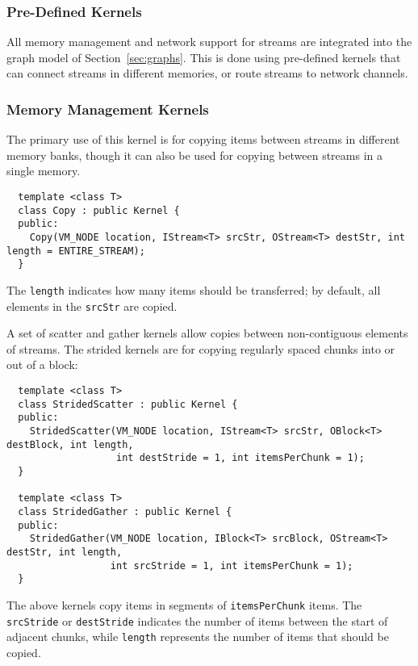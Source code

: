 \subsubsection{Pre-Defined Kernels}
\label{sec:kernelsvm}

\label{sec:predef}

All memory management and network support for streams are integrated
into the graph model of Section~\ref{sec:graphs}.  This is done
using pre-defined kernels that can connect streams in different
memories, or route streams to network channels.

\subsubsection*{Memory Management Kernels}

 The primary use of this kernel is for copying items
between streams in different memory banks, though it can also be used
for copying between streams in a single memory.
{\small
\begin{verbatim}
  template <class T>
  class Copy : public Kernel {
  public:
    Copy(VM_NODE location, IStream<T> srcStr, OStream<T> destStr, int length = ENTIRE_STREAM);
  }
\end{verbatim}}
The {\tt length} indicates how many items should be transferred; by
default, all elements in the {\tt srcStr} are copied.

 A set of scatter and gather kernels allow copies
between non-contiguous elements of streams.  The strided kernels are
for copying regularly spaced chunks into or out of a block:
{\small
\begin{verbatim}
  template <class T>
  class StridedScatter : public Kernel {
  public:
    StridedScatter(VM_NODE location, IStream<T> srcStr, OBlock<T> destBlock, int length,
                   int destStride = 1, int itemsPerChunk = 1);
  }

  template <class T>
  class StridedGather : public Kernel {
  public:
    StridedGather(VM_NODE location, IBlock<T> srcBlock, OStream<T> destStr, int length,
                  int srcStride = 1, int itemsPerChunk = 1);
  }  
\end{verbatim}}
The above kernels copy items in segments of {\tt itemsPerChunk} items.
The {\tt srcStride} or {\tt destStride} indicates the number of items
between the start of adjacent chunks, while {\tt length} represents
the number of items that should be copied.

